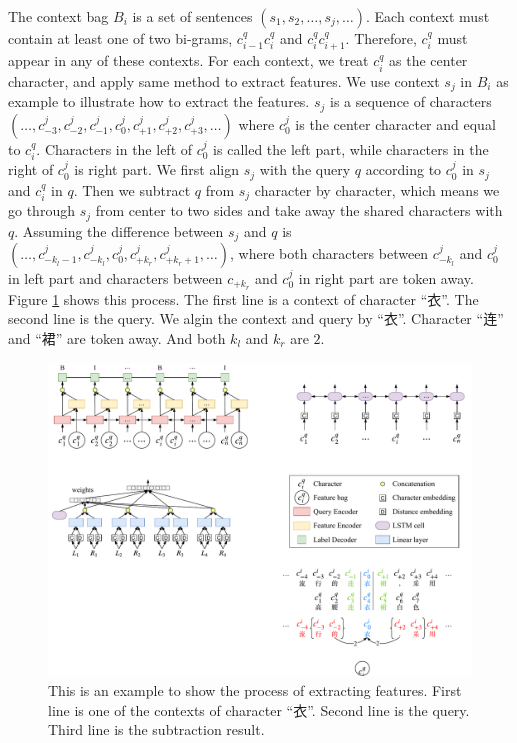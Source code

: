 The context bag $B_i$ is a set of sentences $(s_1, s_2, \ldots, s_j, \ldots)$. Each context must contain at least one of two bi-grams, $c_{i-1}^q c_i^q$ and $c_i^q c_{i+1}^q$. Therefore, $c_i^q$ must appear in any of these contexts. For each context, we treat $c_i^q$ as the center character, and apply same method to extract features. We use context $s_j$ in $B_i$ as example to illustrate how to extract the features. $s_j$ is a sequence of characters $(\ldots, c_{-3}^j, c_{-2}^j, c_{-1}^j, c_{0}^j, c_{+1}^j, c_{+2}^j, c_{+3}^j, \ldots)$ where $c_0^j$ is the center character and equal to $c_i^q$. Characters in the left of $c_0^j$ is called the left part, while characters in the right of $c_0^j$ is right part. We first align $s_j$ with the query $q$ according to $c_0^j$ in $s_j$ and $c_i^q$ in $q$. Then we subtract $q$ from $s_j$ character by character, which means we go through $s_j$ from center to two sides and take away the shared characters with $q$. Assuming the difference between $s_j$ and $q$ is $(\ldots, c_{-k_l-1}^j, c_{-k_l}^j, c_{0}^j, c_{+k_r}^j, c_{+k_r+1}^j, \ldots)$, where both characters between $c_{-k_l}^j$ and $c_{0}^j$ in left part and characters between $c_{+k_r}$ and $c_{0}^j$ in right part are token away. Figure \ref{fig:subtract} shows this process. The first line is a context of character ``衣''. The second line is the query. We algin the context and query by ``衣''. Character ``连'' and ``裙'' are token away. And both $k_l$ and $k_r$ are $2$.

\begin{figure}[th]
	\centering
	\includegraphics[width=0.9\columnwidth]{figures/lr.pdf}
	\caption{This is an example to show the process of extracting features. First line is one of the contexts of character ``衣''. Second line is the query. Third line is the subtraction result.}
	\label{fig:subtract}
\end{figure}


